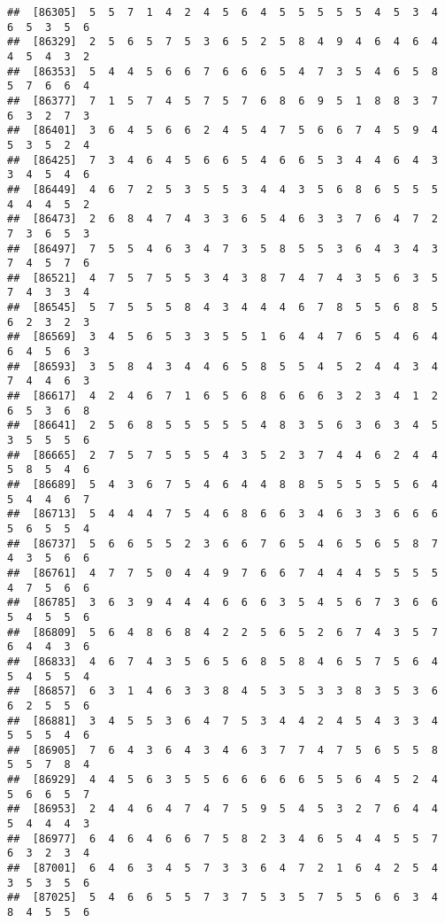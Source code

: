 \documentclass[
]{book}
\begin{document}
\begin{verbatim}
##  [86305]  5  5  7  1  4  2  4  5  6  4  5  5  5  5  5  4  5  3  4  6  5  3  5  6
##  [86329]  2  5  6  5  7  5  3  6  5  2  5  8  4  9  4  6  4  6  4  4  5  4  3  2
##  [86353]  5  4  4  5  6  6  7  6  6  6  5  4  7  3  5  4  6  5  8  5  7  6  6  4
##  [86377]  7  1  5  7  4  5  7  5  7  6  8  6  9  5  1  8  8  3  7  6  3  2  7  3
##  [86401]  3  6  4  5  6  6  2  4  5  4  7  5  6  6  7  4  5  9  4  5  3  5  2  4
##  [86425]  7  3  4  6  4  5  6  6  5  4  6  6  5  3  4  4  6  4  3  3  4  5  4  6
##  [86449]  4  6  7  2  5  3  5  5  3  4  4  3  5  6  8  6  5  5  5  4  4  4  5  2
##  [86473]  2  6  8  4  7  4  3  3  6  5  4  6  3  3  7  6  4  7  2  7  3  6  5  3
##  [86497]  7  5  5  4  6  3  4  7  3  5  8  5  5  3  6  4  3  4  3  7  4  5  7  6
##  [86521]  4  7  5  7  5  5  3  4  3  8  7  4  7  4  3  5  6  3  5  7  4  3  3  4
##  [86545]  5  7  5  5  5  8  4  3  4  4  4  6  7  8  5  5  6  8  5  6  2  3  2  3
##  [86569]  3  4  5  6  5  3  3  5  5  1  6  4  4  7  6  5  4  6  4  6  4  5  6  3
##  [86593]  3  5  8  4  3  4  4  6  5  8  5  5  4  5  2  4  4  3  4  7  4  4  6  3
##  [86617]  4  2  4  6  7  1  6  5  6  8  6  6  6  3  2  3  4  1  2  6  5  3  6  8
##  [86641]  2  5  6  8  5  5  5  5  5  4  8  3  5  6  3  6  3  4  5  3  5  5  5  6
##  [86665]  2  7  5  7  5  5  5  4  3  5  2  3  7  4  4  6  2  4  4  5  8  5  4  6
##  [86689]  5  4  3  6  7  5  4  6  4  4  8  8  5  5  5  5  5  6  4  5  4  4  6  7
##  [86713]  5  4  4  4  7  5  4  6  8  6  6  3  4  6  3  3  6  6  6  5  6  5  5  4
##  [86737]  5  6  6  5  5  2  3  6  6  7  6  5  4  6  5  6  5  8  7  4  3  5  6  6
##  [86761]  4  7  7  5  0  4  4  9  7  6  6  7  4  4  4  5  5  5  5  4  7  5  6  6
##  [86785]  3  6  3  9  4  4  4  6  6  6  3  5  4  5  6  7  3  6  6  5  4  5  5  6
##  [86809]  5  6  4  8  6  8  4  2  2  5  6  5  2  6  7  4  3  5  7  6  4  4  3  6
##  [86833]  4  6  7  4  3  5  6  5  6  8  5  8  4  6  5  7  5  6  4  5  4  5  5  4
##  [86857]  6  3  1  4  6  3  3  8  4  5  3  5  3  3  8  3  5  3  6  6  2  5  5  6
##  [86881]  3  4  5  5  3  6  4  7  5  3  4  4  2  4  5  4  3  3  4  5  5  5  4  6
##  [86905]  7  6  4  3  6  4  3  4  6  3  7  7  4  7  5  6  5  5  8  5  5  7  8  4
##  [86929]  4  4  5  6  3  5  5  6  6  6  6  6  5  5  6  4  5  2  4  5  6  6  5  7
##  [86953]  2  4  4  6  4  7  4  7  5  9  5  4  5  3  2  7  6  4  4  5  4  4  4  3
##  [86977]  6  4  6  4  6  6  7  5  8  2  3  4  6  5  4  4  5  5  7  6  3  2  3  4
##  [87001]  6  4  6  3  4  5  7  3  3  6  4  7  2  1  6  4  2  5  4  3  5  3  5  6
##  [87025]  5  4  6  6  5  5  7  3  7  5  3  5  7  5  5  6  6  3  4  8  4  5  5  6

\end{verbatim}
\end{document}
